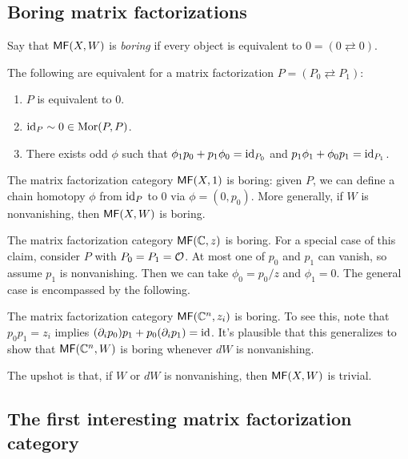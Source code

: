 \documentclass{article}
\begin{document}
\subsection{Boring matrix factorizations}

Say that $\mathsf{MF}(X, W)$ is \emph{boring} if every object is equivalent to $0 = (0 \rightleftarrows 0)$.

\begin{lem}
	The following are equivalent for a matrix factorization $P = (P_0 \rightleftarrows P_1)$:
	\begin{enumerate}
		\item $P$ is equivalent to $0$.
		\item $\operatorname{id}_P \sim 0 \in \operatorname{Mor}(P, P)$.
		\item There exists odd $\phi$ such that $\phi_1 p_0 + p_1 \phi_0 = \operatorname{id}_{P_0}$ and $p_1 \phi_1 + \phi_0 p_1 = \operatorname{id}_{P_1}$.
	\end{enumerate}
\end{lem}

\begin{ex}
	The matrix factorization category $\mathsf{MF}(X, 1)$ is boring: given $P$, we can define a chain homotopy $\phi$ from $\operatorname{id}_P$ to $0$ via $\phi = (0, p_0)$.
	More generally, if $W$ is nonvanishing, then $\mathsf{MF}(X, W)$ is boring.
\end{ex}

\begin{ex}
	The matrix factorization category $\mathsf{MF}(\mathbb{C}, z)$ is boring.
	For a special case of this claim, consider $P$ with $P_0 = P_1 = \mathcal{O}$.
	At most one of $p_0$ and $p_1$ can vanish, so assume $p_1$ is nonvanishing.
	Then we can take $\phi_0 = p_0 / z$ and $\phi_1 = 0$.
	The general case is encompassed by the following.
\end{ex}
		
\begin{ex}
	The matrix factorization category $\mathsf{MF}(\mathbb{C}^n, z_i)$ is boring.
	To see this, note that $p_0 p_1 = z_i$ implies $(\partial_i p_0) p_1 + p_0 (\partial_i p_1) = \operatorname{id}$.
	It's plausible that this generalizes to show that $\mathsf{MF}(\mathbb{C}^n, W)$ is boring whenever $dW$ is nonvanishing.
\end{ex}

The upshot is that, if $W$ or $dW$ is nonvanishing, then $\mathsf{MF}(X, W)$ is trivial.

\subsection{The first interesting matrix factorization category}
\end{document}
